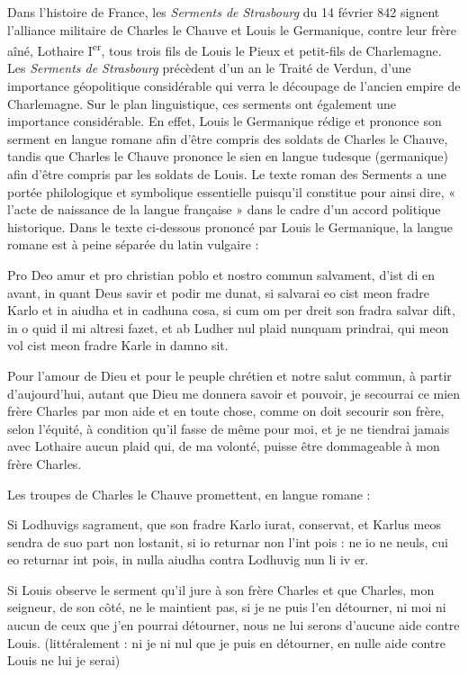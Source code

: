 Dans l’histoire de France, les \textit{Serments de Strasbourg} du 14 février 842 signent l’alliance militaire de Charles le Chauve et Louis le Germanique, contre leur frère aîné, Lothaire I\textsuperscript{er}, tous trois fils de Louis le Pieux et petit-fils de Charlemagne. Les \textit{Serments de Strasbourg} précèdent d’un an le Traité de Verdun, d’une importance géopolitique considérable qui verra le découpage de l’ancien empire de Charlemagne. Sur le plan linguistique, ces serments ont également une importance considérable. En effet, Louis le Germanique rédige et prononce son serment en langue romane afin d’être compris des soldats de Charles le Chauve, tandis que Charles le Chauve prononce le sien en langue tudesque (germanique) afin d’être compris par les soldats de Louis. Le texte roman des Serments a une portée philologique et symbolique essentielle puisqu’il constitue pour ainsi dire, « l’acte de naissance de la langue française » dans le cadre d’un accord politique historique. Dans le texte ci-dessous prononcé par Louis le Germanique, la langue romane est à peine séparée du latin vulgaire :
\begin{lecture}{}
Pro Deo amur et pro christian poblo et nostro commun salvament, d’ist di en avant, in quant Deus savir et podir me dunat, si salvarai eo cist meon fradre Karlo et in aiudha et in cadhuna cosa, si cum om per dreit son fradra salvar dift, in o quid il mi altresi fazet, et ab Ludher nul
plaid nunquam prindrai, qui meon vol cist meon fradre Karle in damno sit.

Pour l’amour de Dieu et pour le peuple chrétien et notre salut commun, à partir d’aujourd’hui, autant que Dieu me donnera savoir et pouvoir, je secourrai ce mien frère Charles par mon aide et en toute chose, comme on doit secourir son frère, selon l’équité, à condition qu’il fasse de même pour moi, et je ne tiendrai jamais avec Lothaire aucun plaid qui, de ma volonté, puisse être dommageable à mon frère Charles.
\end{lecture}
Les troupes de Charles le Chauve promettent, en langue romane :
\begin{lecture}{}
Si Lodhuvigs sagrament, que son fradre Karlo iurat, conservat, et Karlus meos sendra de suo part non lostanit, si io returnar non l’int pois : ne io ne neuls, cui eo returnar int pois, in nulla aiudha contra Lodhuvig nun li iv er.

Si Louis observe le serment qu’il jure à son frère Charles et que Charles, mon seigneur, de son côté, ne le maintient pas, si je ne puis l’en détourner, ni moi ni aucun de ceux que j’en pourrai détourner, nous ne lui serons d’aucune aide contre Louis. (littéralement : ni je ni nul que je puis en détourner, en nulle aide contre Louis ne lui je serai)
\end{lecture}


